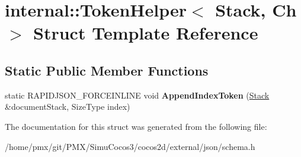 \hypertarget{structinternal_1_1TokenHelper}{}\section{internal\+:\+:Token\+Helper$<$ Stack, Ch $>$ Struct Template Reference}
\label{structinternal_1_1TokenHelper}
\subsection*{Static Public Member Functions}
\begin{DoxyCompactItemize}
\item 
\mbox{\label{structinternal_1_1TokenHelper_a7b1864bfe6d4014ba7a5114acb26b3ae}} 
static R\+A\+P\+I\+D\+J\+S\+O\+N\+\_\+\+F\+O\+R\+C\+E\+I\+N\+L\+I\+NE void {\bfseries Append\+Index\+Token} (\hyperlink{classinternal_1_1Stack}{Stack} \&document\+Stack, Size\+Type index)
\end{DoxyCompactItemize}


The documentation for this struct was generated from the following file\+:\begin{DoxyCompactItemize}
\item 
/home/pmx/git/\+P\+M\+X/\+Simu\+Cocos3/cocos2d/external/json/schema.\+h\end{DoxyCompactItemize}
